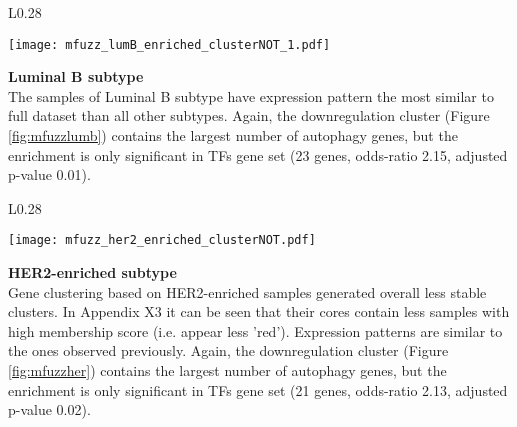         \begin{wrapfigure}{L}{0.28\textwidth}
        \hfill
        \captionsetup{justification=centering}
        \centerline{ \texttt{[image: mfuzz\_lumB\_enriched\_clusterNOT\_1.pdf]}}
        \vspace*{-8mm}
        \caption{\label{fig:mfuzzlumb}Luminal B\newline downregulation cluster}
        \end{wrapfigure}
        
        
        \textbf{Luminal B subtype}\\      
        The samples of Luminal B subtype have expression pattern the most similar to full dataset than all other subtypes. Again, the downregulation cluster (Figure \ref{fig:mfuzzlumb}) contains the largest number of autophagy genes, but the enrichment is only significant in TFs gene set (23 genes, odds-ratio 2.15, adjusted p-value 0.01). 
        \newline
        \newline
        \newline
        \newline
        \newline

      
        \begin{wrapfigure}{L}{0.28\textwidth}
        \hfill
        \captionsetup{justification=centering}
        \centerline{ \texttt{[image: mfuzz\_her2\_enriched\_clusterNOT.pdf]}}
        \vspace*{-8mm}
        \caption{\label{fig:mfuzzher}HER2-enriched \newline downregulation cluster}
        \end{wrapfigure}
     
     
        \textbf{HER2-enriched subtype}\\   
        Gene clustering based on HER2-enriched samples generated overall less stable clusters. In Appendix X3 it can be seen that their cores contain less samples with high membership score (i.e. appear less 'red'). Expression patterns are similar to the ones observed previously. Again, the downregulation cluster (Figure \ref{fig:mfuzzher}) contains the largest number of autophagy genes, but the enrichment is only significant in TFs gene set (21 genes, odds-ratio 2.13, adjusted p-value 0.02).
        \newline
        \newline
        \newline        


